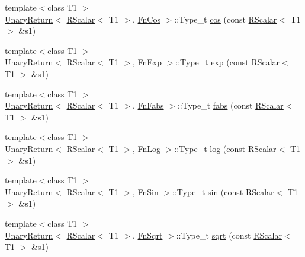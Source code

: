 \begin{DoxyCompactItemize}
\item 
{\footnotesize template$<$class T1 $>$ }\\\mbox{\hyperlink{structENSEM_1_1UnaryReturn}{Unary\+Return}}$<$ \mbox{\hyperlink{classENSEM_1_1RScalar}{R\+Scalar}}$<$ T1 $>$, \mbox{\hyperlink{structENSEM_1_1FnCos}{Fn\+Cos}} $>$\+::Type\+\_\+t \mbox{\hyperlink{group__rscalar_ga5d977b28190b3cf44c5ef2aa98af9156}{cos}} (const \mbox{\hyperlink{classENSEM_1_1RScalar}{R\+Scalar}}$<$ T1 $>$ \&s1)
\item 
{\footnotesize template$<$class T1 $>$ }\\\mbox{\hyperlink{structENSEM_1_1UnaryReturn}{Unary\+Return}}$<$ \mbox{\hyperlink{classENSEM_1_1RScalar}{R\+Scalar}}$<$ T1 $>$, \mbox{\hyperlink{structENSEM_1_1FnExp}{Fn\+Exp}} $>$\+::Type\+\_\+t \mbox{\hyperlink{group__rscalar_ga7555010fd1580f0b6a1d85cd4e925ce1}{exp}} (const \mbox{\hyperlink{classENSEM_1_1RScalar}{R\+Scalar}}$<$ T1 $>$ \&s1)
\item 
{\footnotesize template$<$class T1 $>$ }\\\mbox{\hyperlink{structENSEM_1_1UnaryReturn}{Unary\+Return}}$<$ \mbox{\hyperlink{classENSEM_1_1RScalar}{R\+Scalar}}$<$ T1 $>$, \mbox{\hyperlink{structENSEM_1_1FnFabs}{Fn\+Fabs}} $>$\+::Type\+\_\+t \mbox{\hyperlink{group__rscalar_ga4f8b1e156677c7d98bb51e70915b9239}{fabs}} (const \mbox{\hyperlink{classENSEM_1_1RScalar}{R\+Scalar}}$<$ T1 $>$ \&s1)
\item 
{\footnotesize template$<$class T1 $>$ }\\\mbox{\hyperlink{structENSEM_1_1UnaryReturn}{Unary\+Return}}$<$ \mbox{\hyperlink{classENSEM_1_1RScalar}{R\+Scalar}}$<$ T1 $>$, \mbox{\hyperlink{structENSEM_1_1FnLog}{Fn\+Log}} $>$\+::Type\+\_\+t \mbox{\hyperlink{group__rscalar_gacf4bc45f226554e38012a20a649605ed}{log}} (const \mbox{\hyperlink{classENSEM_1_1RScalar}{R\+Scalar}}$<$ T1 $>$ \&s1)
\item 
{\footnotesize template$<$class T1 $>$ }\\\mbox{\hyperlink{structENSEM_1_1UnaryReturn}{Unary\+Return}}$<$ \mbox{\hyperlink{classENSEM_1_1RScalar}{R\+Scalar}}$<$ T1 $>$, \mbox{\hyperlink{structENSEM_1_1FnSin}{Fn\+Sin}} $>$\+::Type\+\_\+t \mbox{\hyperlink{group__rscalar_ga60f574c6e8f0da11360b8c41c46490a5}{sin}} (const \mbox{\hyperlink{classENSEM_1_1RScalar}{R\+Scalar}}$<$ T1 $>$ \&s1)
\item 
{\footnotesize template$<$class T1 $>$ }\\\mbox{\hyperlink{structENSEM_1_1UnaryReturn}{Unary\+Return}}$<$ \mbox{\hyperlink{classENSEM_1_1RScalar}{R\+Scalar}}$<$ T1 $>$, \mbox{\hyperlink{structENSEM_1_1FnSqrt}{Fn\+Sqrt}} $>$\+::Type\+\_\+t \mbox{\hyperlink{group__rscalar_ga1f127fac0ef1cb032c7bd632657439bf}{sqrt}} (const \mbox{\hyperlink{classENSEM_1_1RScalar}{R\+Scalar}}$<$ T1 $>$ \&s1)

\end{DoxyCompactItemize}
